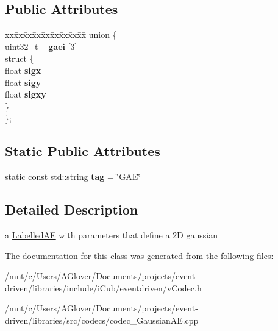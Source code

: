 \subsection*{Public Attributes}
\begin{DoxyCompactItemize}
\item 
\mbox{\label{classev_1_1GaussianAE_a13e0c15248195b159d6b672ea3596611}} 
\begin{tabbing}
xx\=xx\=xx\=xx\=xx\=xx\=xx\=xx\=xx\=\kill
union \{\\
\>uint32\_t {\bfseries \_gaei} \mbox{[}3\mbox{]}\\
\mbox{\label{unionev_1_1GaussianAE_1_1_0D13_aebead89f411b9301f4fdb56ef30ba0c0}} 
\>struct \{\\
\>\>float {\bfseries sigx}\\
\>\>float {\bfseries sigy}\\
\>\>float {\bfseries sigxy}\\
\>\} \\
\}; \\

\end{tabbing}\end{DoxyCompactItemize}
\subsection*{Static Public Attributes}
\begin{DoxyCompactItemize}
\item 
\mbox{\label{classev_1_1GaussianAE_a6d0ea5de274ddd380b056d2ba8b019e2}} 
static const std\+::string {\bfseries tag} = \char`\"{}G\+AE\char`\"{}
\end{DoxyCompactItemize}


\subsection{Detailed Description}
a \hyperlink{classev_1_1LabelledAE}{Labelled\+AE} with parameters that define a 2D gaussian 

The documentation for this class was generated from the following files\+:\begin{DoxyCompactItemize}
\item 
/mnt/c/\+Users/\+A\+Glover/\+Documents/projects/event-\/driven/libraries/include/i\+Cub/eventdriven/v\+Codec.\+h\item 
/mnt/c/\+Users/\+A\+Glover/\+Documents/projects/event-\/driven/libraries/src/codecs/codec\+\_\+\+Gaussian\+A\+E.\+cpp\end{DoxyCompactItemize}
